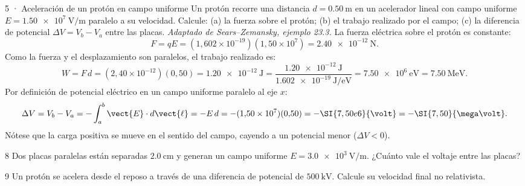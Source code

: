 \documentclass[11pt]{article}
\begin{document}

\begin{eResuelto}{5 · Aceleración de un protón en campo uniforme}
Un protón recorre una distancia $d=\SI{0,50}{\metre}$ en un acelerador lineal con campo uniforme $E=\SI{1,50e7}{\volt\per\metre}$ paralelo a su velocidad. Calcule: (a) la fuerza sobre el protón; (b) el trabajo realizado por el campo; (c) la diferencia de potencial $\Delta V=V_b-V_a$ entre las placas. \emph{Adaptado de Sears--Zemansky, ejemplo 23.3.}
La fuerza eléctrica sobre el protón es constante:
\[ F = qE = (1{,}602\times10^{-19})(1{,}50\times10^7) = \SI{2,40e-12}{\newton}. \]
Como la fuerza y el desplazamiento son paralelos, el trabajo realizado es:
\[ W = F\,d = (2{,}40\times10^{-12})(0{,}50) = \SI{1,20e-12}{\joule} = \frac{\SI{1,20e-12}{\joule}}{\SI{1,602e-19}{\joule\per\electronvolt}} = \SI{7,50e6}{\electronvolt} = \SI{7,50}{\mega\electronvolt}. \]
Por definición de potencial eléctrico en un campo uniforme paralelo al eje $x$:
\[ \Delta V = V_b - V_a = -\int_a^b \vect{E}\cdot d\vect{\ell} = -E\,d = -(1{,}50\times10^7)(0{,}50) = -\SI{7,50e6}{\volt} = -\SI{7,50}{\mega\volt}. \]
Nótese que la carga positiva se mueve en el sentido del campo, cayendo a un potencial menor ($\Delta V < 0$).
\end{eResuelto}

\begin{eReto}{8 }
Dos placas paralelas están separadas $\SI{2,0}{\centi\metre}$ y generan un campo uniforme $E=\SI{3,0e3}{\volt\per\metre}$. ¿Cuánto vale el voltaje entre las placas?
\end{eReto}

\begin{eReto}{9 }
Un protón se acelera desde el reposo a través de una diferencia de potencial de $\SI{500}{\kilo\volt}$. Calcule su velocidad final no relativista.
\end{eReto}

\end{document}
